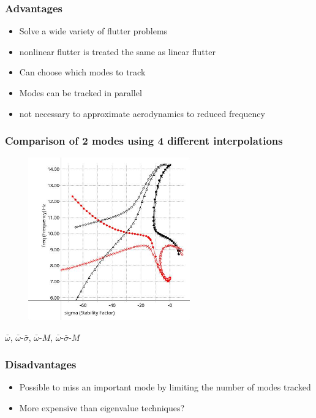 \documentclass{beamer}
\begin{document}
\begin{frame}
	\frametitle{Advantages}
	\begin{itemize}
		\item Solve a wide variety of flutter problems
		\item nonlinear flutter is treated the same as linear flutter
		\item Can choose which modes to track
		\item Modes can be tracked in parallel
		\item not necessary to approximate aerodynamics to reduced frequency
	\end{itemize}
\end{frame}

\begin{frame}
	\frametitle{Comparison of 2 modes using 4 different interpolations}
		\includegraphics[height=7cm,width=9cm]{dlm.jpg}

			$\bar{\omega}$, $\bar{\omega}$-$\bar{\sigma}$,
			$\bar{\omega}$-$M$, $\bar{\omega}$-$\bar{\sigma}$-$M$

\end{frame}

\begin{frame}
	\frametitle{Disadvantages}
	\begin{itemize}
		\item Possible to miss an important mode by limiting the
		number of modes tracked
		\item More expensive than eigenvalue techniques?
	\end{itemize}
\end{frame}
\end{document}
